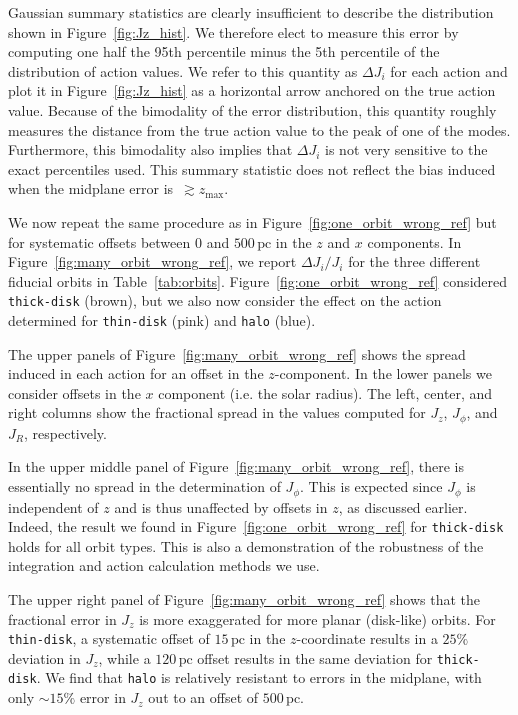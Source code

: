 \documentclass[twocolumn]{aastex62}
\newcommand{\pc}{\text{pc}}
\newcommand{\thin}{\texttt{thin-disk}}
\newcommand{\thick}{\texttt{thick-disk}}
\newcommand{\halo}{\texttt{halo}}
\newcommand{\thincolor}{pink}
\newcommand{\thickcolor}{brown}
\newcommand{\halocolor}{blue}
\begin{document}
Gaussian summary statistics are clearly insufficient to describe the distribution shown in
Figure~\ref{fig:Jz_hist}. We therefore elect to measure this error by computing one
half the 95th percentile minus the 5th percentile of the distribution
of action values. We refer to this quantity as $\Delta J_i$ for each action and plot it in Figure~\ref{fig:Jz_hist} as a horizontal arrow anchored on the true action value.
 Because of the bimodality
of the error distribution, this quantity roughly measures the distance from
the true action value to the peak of one of the modes. Furthermore, this
bimodality also implies that $\Delta J_i$ is not very sensitive to the exact
percentiles used. This summary statistic does not reflect the bias induced
when the midplane error is~$\gtrsim z_{\text{max}}$.

We now repeat the same procedure as in Figure~\ref{fig:one_orbit_wrong_ref}
but for systematic offsets between $0$ and $500\,\pc$ in the $z$ and $x$
components. In Figure~\ref{fig:many_orbit_wrong_ref}, we report $\Delta
J_i/J_i$ for the three different fiducial orbits in Table~\ref{tab:orbits}.
Figure~\ref{fig:one_orbit_wrong_ref} considered \thick{} (\thickcolor), but we also now consider the effect on
the action determined for \thin{} (\thincolor) and \halo{} (\halocolor).

The upper panels of Figure~\ref{fig:many_orbit_wrong_ref} shows the spread
induced in each action for an offset in the $z$-component. In the lower panels we consider offsets in the $x$ component (i.e. the
solar radius). The left, center, and right columns show the fractional spread
in the values computed for $J_z$, $J_{\phi}$, and $J_R$, respectively.

In the upper middle panel of Figure~\ref{fig:many_orbit_wrong_ref}, there is
essentially no spread in the determination of $J_{\phi}$. This is expected
since $J_{\phi}$ is independent of $z$ and is thus unaffected by offsets in
$z$, as discussed earlier. Indeed, the result we found in
Figure~\ref{fig:one_orbit_wrong_ref} for \thick{} holds for all
orbit types. This is also a demonstration of the robustness of the
integration and action calculation methods we use.

The upper right panel of Figure~\ref{fig:many_orbit_wrong_ref} shows that the
fractional error in $J_z$ is more exaggerated for more planar (disk-like)
orbits. For \thin{}, 
a systematic offset of $15\,\pc$
in the $z$-coordinate results in a $25\%$ deviation in $J_z$,
while a $120\,\pc$ offset results in the same deviation for \thick{}.
We find that \halo{} is relatively resistant to errors in the midplane, with
only $\sim15\%$ error in $J_z$ out to an offset of $500\,\pc$.
\end{document}
